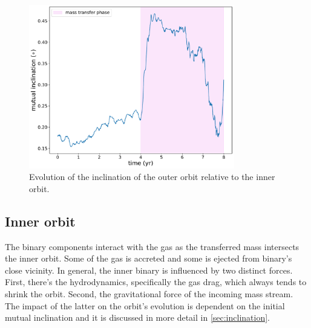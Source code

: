 \begin{figure}[H]
    \centering
    \includegraphics[width=0.8\textwidth]{Thesis/graphs/inc_00/accretion_inc_00_inc.pdf}
    \caption{Evolution of the inclination of the outer orbit relative to the inner orbit.}
    \label{fig:accretion_inc_00_inc}
\end{figure}


\subsection{Inner orbit}

The binary components interact with the gas as the transferred mass intersects the inner orbit. Some of the gas is accreted and some is ejected from binary's close vicinity. In general, the inner binary is influenced by two distinct forces. First, there's the hydrodynamics, specifically the gas drag, which always tends to shrink the orbit. Second, the gravitational force of the incoming mass stream. The impact of the latter on the orbit's evolution is dependent on the initial mutual inclination and it is discussed in more detail in \cref{sec:inclination}. 

